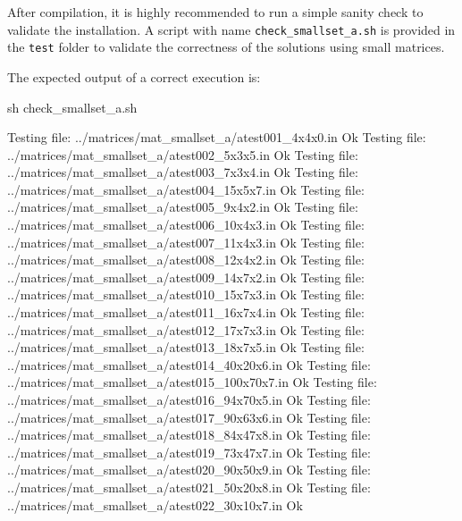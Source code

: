 \documentclass[]{article}
\newenvironment{Shaded}{}{}
\newcommand{\ExtensionTok}[1]{#1}
\newcommand{\FunctionTok}[1]{\textcolor[rgb]{0.02,0.16,0.49}{#1}}
\newcommand{\NormalTok}[1]{#1}
\begin{document}
After compilation, it is highly recommended to run a simple sanity check
to validate the installation. A script with name
\texttt{check\_smallset\_a.sh} is provided in the \texttt{test} folder
to validate the correctness of the solutions using small matrices.

The expected output of a correct execution is:

\begin{Shaded}
\begin{Highlighting}[]
\FunctionTok{sh}\NormalTok{ check_smallset_a.sh }
 
\ExtensionTok{Testing}\NormalTok{ file:  ../matrices/mat_smallset_a/atest001_4x4x0.in     Ok}
\ExtensionTok{Testing}\NormalTok{ file:  ../matrices/mat_smallset_a/atest002_5x3x5.in     Ok}
\ExtensionTok{Testing}\NormalTok{ file:  ../matrices/mat_smallset_a/atest003_7x3x4.in     Ok}
\ExtensionTok{Testing}\NormalTok{ file:  ../matrices/mat_smallset_a/atest004_15x5x7.in     Ok}
\ExtensionTok{Testing}\NormalTok{ file:  ../matrices/mat_smallset_a/atest005_9x4x2.in     Ok}
\ExtensionTok{Testing}\NormalTok{ file:  ../matrices/mat_smallset_a/atest006_10x4x3.in     Ok}
\ExtensionTok{Testing}\NormalTok{ file:  ../matrices/mat_smallset_a/atest007_11x4x3.in     Ok}
\ExtensionTok{Testing}\NormalTok{ file:  ../matrices/mat_smallset_a/atest008_12x4x2.in     Ok}
\ExtensionTok{Testing}\NormalTok{ file:  ../matrices/mat_smallset_a/atest009_14x7x2.in     Ok}
\ExtensionTok{Testing}\NormalTok{ file:  ../matrices/mat_smallset_a/atest010_15x7x3.in     Ok}
\ExtensionTok{Testing}\NormalTok{ file:  ../matrices/mat_smallset_a/atest011_16x7x4.in     Ok}
\ExtensionTok{Testing}\NormalTok{ file:  ../matrices/mat_smallset_a/atest012_17x7x3.in     Ok}
\ExtensionTok{Testing}\NormalTok{ file:  ../matrices/mat_smallset_a/atest013_18x7x5.in     Ok}
\ExtensionTok{Testing}\NormalTok{ file:  ../matrices/mat_smallset_a/atest014_40x20x6.in     Ok}
\ExtensionTok{Testing}\NormalTok{ file:  ../matrices/mat_smallset_a/atest015_100x70x7.in     Ok}
\ExtensionTok{Testing}\NormalTok{ file:  ../matrices/mat_smallset_a/atest016_94x70x5.in     Ok}
\ExtensionTok{Testing}\NormalTok{ file:  ../matrices/mat_smallset_a/atest017_90x63x6.in     Ok}
\ExtensionTok{Testing}\NormalTok{ file:  ../matrices/mat_smallset_a/atest018_84x47x8.in     Ok}
\ExtensionTok{Testing}\NormalTok{ file:  ../matrices/mat_smallset_a/atest019_73x47x7.in     Ok}
\ExtensionTok{Testing}\NormalTok{ file:  ../matrices/mat_smallset_a/atest020_90x50x9.in     Ok}
\ExtensionTok{Testing}\NormalTok{ file:  ../matrices/mat_smallset_a/atest021_50x20x8.in     Ok}
\ExtensionTok{Testing}\NormalTok{ file:  ../matrices/mat_smallset_a/atest022_30x10x7.in     Ok}

\end{Highlighting}
\end{Shaded}
\end{document}

